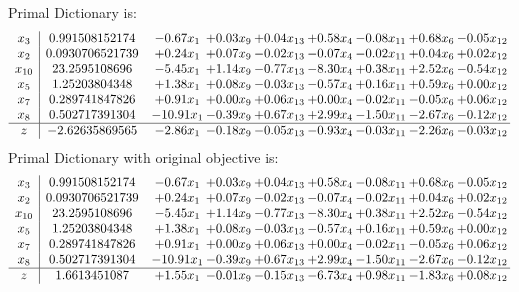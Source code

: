 \documentclass[9pt]{article}
\begin{document}
Primal Dictionary is:
\[\begin{array}{c| c c@{\hskip 2pt} c@{\hskip 2pt} c@{\hskip 2pt} c@{\hskip 2pt} c@{\hskip 2pt} c@{\hskip 2pt} c@{\hskip 2pt} }
 x_{3}   &  0.991508152174 & -0.67 x_{1} & +  0.03 x_{9} & +  0.04 x_{13} & +  0.58 x_{4} & -0.08 x_{11} & +  0.68 x_{6} & -0.05 x_{12}\\
 x_{2}   &  0.0930706521739 & +  0.24 x_{1} & +  0.07 x_{9} & -0.02 x_{13} & -0.07 x_{4} & -0.02 x_{11} & +  0.04 x_{6} & +  0.02 x_{12}\\
 x_{10}   &  23.2595108696 & -5.45 x_{1} & +  1.14 x_{9} & -0.77 x_{13} & -8.30 x_{4} & +  0.38 x_{11} & +  2.52 x_{6} & -0.54 x_{12}\\
 x_{5}   &  1.25203804348 & +  1.38 x_{1} & +  0.08 x_{9} & -0.03 x_{13} & -0.57 x_{4} & +  0.16 x_{11} & +  0.59 x_{6} & +  0.00 x_{12}\\
 x_{7}   &  0.289741847826 & +  0.91 x_{1} & +  0.00 x_{9} & +  0.06 x_{13} & +  0.00 x_{4} & -0.02 x_{11} & -0.05 x_{6} & +  0.06 x_{12}\\
 x_{8}   &  0.502717391304 & -10.91 x_{1} & -0.39 x_{9} & +  0.67 x_{13} & +  2.99 x_{4} & -1.50 x_{11} & -2.67 x_{6} & -0.12 x_{12}\\
\hline
z    &  -2.62635869565 & -2.86 x_{1} & -0.18 x_{9} & -0.05 x_{13} & -0.93 x_{4} & -0.03 x_{11} & -2.26 x_{6} & -0.03 x_{12}\\
\end{array}\]
Primal Dictionary with original objective is:
\[\begin{array}{c| c c@{\hskip 2pt} c@{\hskip 2pt} c@{\hskip 2pt} c@{\hskip 2pt} c@{\hskip 2pt} c@{\hskip 2pt} c@{\hskip 2pt} }
 x_{3}   &  0.991508152174 & -0.67 x_{1} & +  0.03 x_{9} & +  0.04 x_{13} & +  0.58 x_{4} & -0.08 x_{11} & +  0.68 x_{6} & -0.05 x_{12}\\
 x_{2}   &  0.0930706521739 & +  0.24 x_{1} & +  0.07 x_{9} & -0.02 x_{13} & -0.07 x_{4} & -0.02 x_{11} & +  0.04 x_{6} & +  0.02 x_{12}\\
 x_{10}   &  23.2595108696 & -5.45 x_{1} & +  1.14 x_{9} & -0.77 x_{13} & -8.30 x_{4} & +  0.38 x_{11} & +  2.52 x_{6} & -0.54 x_{12}\\
 x_{5}   &  1.25203804348 & +  1.38 x_{1} & +  0.08 x_{9} & -0.03 x_{13} & -0.57 x_{4} & +  0.16 x_{11} & +  0.59 x_{6} & +  0.00 x_{12}\\
 x_{7}   &  0.289741847826 & +  0.91 x_{1} & +  0.00 x_{9} & +  0.06 x_{13} & +  0.00 x_{4} & -0.02 x_{11} & -0.05 x_{6} & +  0.06 x_{12}\\
 x_{8}   &  0.502717391304 & -10.91 x_{1} & -0.39 x_{9} & +  0.67 x_{13} & +  2.99 x_{4} & -1.50 x_{11} & -2.67 x_{6} & -0.12 x_{12}\\
\hline
z    &  1.6613451087 & +  1.55 x_{1} & -0.01 x_{9} & -0.15 x_{13} & -6.73 x_{4} & +  0.98 x_{11} & -1.83 x_{6} & +  0.08 x_{12}\\
\end{array}\]
\end{document}
